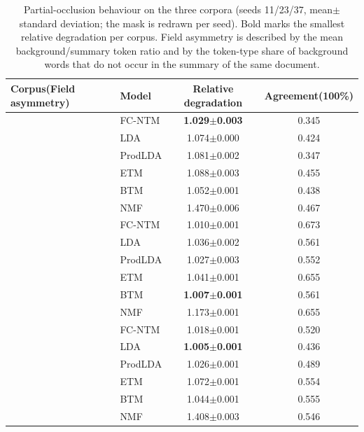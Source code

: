 \documentclass[11pt]{article}
\newcommand{\fcntm}{FC-NTM}
\begin{document}
\begin{table}[t]
\centering
\caption{Partial-occlusion behaviour on the three corpora (seeds 11/23/37, mean$\pm$standard deviation; the mask is redrawn per seed). Bold marks the smallest relative degradation per corpus. Field asymmetry is described by the mean background/summary token ratio and by the token-type share of background words that do not occur in the summary of the same document.}
\label{tab:occl-cross}
\footnotesize
\setlength{\tabcolsep}{3pt}
\begin{tabular}{@{}llcc@{}}
\toprule
Corpus(Field asymmetry) & Model & Relative degradation & Agreement(100\%) \\
\midrule
{}
 & \fcntm{} & \textbf{1.029$\pm$0.003} & 0.345 \\
 & LDA & 1.074$\pm$0.000 & 0.424 \\
 & ProdLDA & 1.081$\pm$0.002 & 0.347 \\
 & ETM & 1.088$\pm$0.003 & 0.455 \\
 & BTM & 1.052$\pm$0.001 & 0.438 \\
 & NMF & 1.470$\pm$0.006 & 0.467 \\
\midrule
{}
 & \fcntm{} & 1.010$\pm$0.001 & 0.673 \\
 & LDA & 1.036$\pm$0.002 & 0.561 \\
 & ProdLDA & 1.027$\pm$0.003 & 0.552 \\
 & ETM & 1.041$\pm$0.001 & 0.655 \\
 & BTM & \textbf{1.007$\pm$0.001} & 0.561 \\
 & NMF & 1.173$\pm$0.001 & 0.655 \\
\midrule
{}
 & \fcntm{} & 1.018$\pm$0.001 & 0.520 \\
 & LDA & \textbf{1.005$\pm$0.001} & 0.436 \\
 & ProdLDA & 1.026$\pm$0.001 & 0.489 \\
 & ETM & 1.072$\pm$0.001 & 0.554 \\
 & BTM & 1.044$\pm$0.001 & 0.555 \\
 & NMF & 1.408$\pm$0.003 & 0.546 \\
\bottomrule
\end{tabular}
\end{table}
\end{document}
